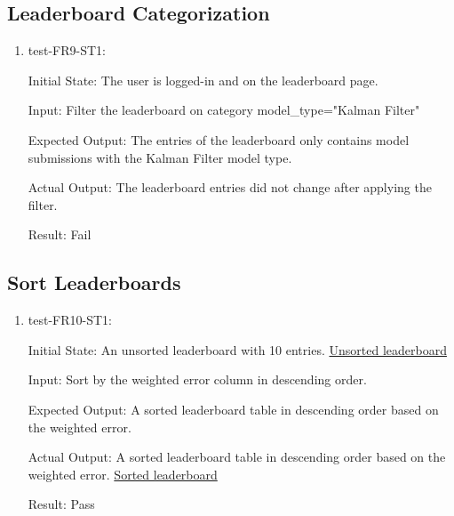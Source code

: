\documentclass[12pt, titlepage]{article}
\begin{document}
\subsection{Leaderboard Categorization}
\begin{enumerate}
    \item test-FR9-ST1:\label{test-FR9-ST1}
    
    Initial State: The user is logged-in and on the leaderboard page.
    
    Input: Filter the leaderboard on category model\_type="Kalman Filter"
    
    Expected Output: The entries of the leaderboard only contains model submissions with the Kalman Filter model type.
    
    Actual Output: The leaderboard entries did not change after applying the filter.
    
    Result: Fail
\end{enumerate}
\subsection{Sort Leaderboards}
\begin{enumerate}
    \item test-FR10-ST1:\label{test-FR10-ST1}
    
    Initial State: An unsorted leaderboard with 10 entries. \href{https://github.com/AidanMariglia/SOCAlgoTestPlatform/blob/main/docs/VnVReport/images/Unsorted_leaderboard.png}{Unsorted leaderboard} 
    
    Input: Sort by the weighted error column in descending order.
    
    Expected Output: A sorted leaderboard table in descending order based on the weighted error.
    
    Actual Output: A sorted leaderboard table in descending order based on the weighted error. \href{https://github.com/AidanMariglia/SOCAlgoTestPlatform/blob/main/docs/VnVReport/images/Sorted_leaderboard.png}{Sorted leaderboard} 
    
    Result: Pass
\end{enumerate}
\end{document}
